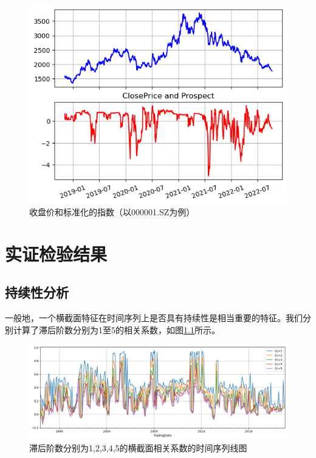 \documentclass[a4paper,12pt]{report}
\begin{document}
\begin{figure}[htbp]
	\centering
	\includegraphics{figure/prospect_index_000001}
	\caption{收盘价和标准化的指数（以000001.SZ为例）}
	\label{fig:prospect_index_000001}
\end{figure}

\chapter{实证检验结果}

\section{持续性分析}
一般地，一个横截面特征在时间序列上是否具有持续性是相当重要的特征。我们分别计算了滞后阶数分别为1至5的相关系数，如图\ref{fig:consistency}所示。

\begin{figure}[htbp]
	\centering
	\includegraphics[scale=0.5]{figure/consistency}
	\caption{滞后阶数分别为1,2,3,4,5的横截面相关系数的时间序列线图}
	\label{fig:consistency}
\end{figure}
\end{document}
